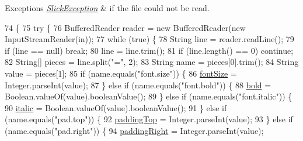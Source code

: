 \begin{DoxyExceptions}{Exceptions}
{\em \mbox{\hyperlink{classorg_1_1newdawn_1_1slick_1_1_slick_exception}{Slick\+Exception}}} & if the file could not be read. \\
\hline
\end{DoxyExceptions}

\begin{DoxyCode}
74                                                                \{
75         \textcolor{keywordflow}{try} \{
76             BufferedReader reader = \textcolor{keyword}{new} BufferedReader(\textcolor{keyword}{new} InputStreamReader(in));
77             \textcolor{keywordflow}{while} (\textcolor{keyword}{true}) \{
78                 String line = reader.readLine();
79                 \textcolor{keywordflow}{if} (line == null) \textcolor{keywordflow}{break};
80                 line = line.trim();
81                 \textcolor{keywordflow}{if} (line.length() == 0) \textcolor{keywordflow}{continue};
82                 String[] pieces = line.split(\textcolor{stringliteral}{"="}, 2);
83                 String name = pieces[0].trim();
84                 String value = pieces[1];
85                 \textcolor{keywordflow}{if} (name.equals(\textcolor{stringliteral}{"font.size"})) \{
86                     \mbox{\hyperlink{classorg_1_1newdawn_1_1slick_1_1font_1_1_hiero_settings_a3e39f423902a5895bd26921a14fe1044}{fontSize}} = Integer.parseInt(value);
87                 \} \textcolor{keywordflow}{else} \textcolor{keywordflow}{if} (name.equals(\textcolor{stringliteral}{"font.bold"})) \{
88                     \mbox{\hyperlink{classorg_1_1newdawn_1_1slick_1_1font_1_1_hiero_settings_a836242ef5a8edc24a2b5b8c85f9160eb}{bold}} = Boolean.valueOf(value).booleanValue();
89                 \} \textcolor{keywordflow}{else} \textcolor{keywordflow}{if} (name.equals(\textcolor{stringliteral}{"font.italic"})) \{
90                     \mbox{\hyperlink{classorg_1_1newdawn_1_1slick_1_1font_1_1_hiero_settings_a4e55c90c505a6a53fa3684288d379e6a}{italic}} = Boolean.valueOf(value).booleanValue();
91                 \} \textcolor{keywordflow}{else} \textcolor{keywordflow}{if} (name.equals(\textcolor{stringliteral}{"pad.top"})) \{
92                     \mbox{\hyperlink{classorg_1_1newdawn_1_1slick_1_1font_1_1_hiero_settings_ad0793e48192b48898df4f3a31d4b3954}{paddingTop}} = Integer.parseInt(value);
93                 \} \textcolor{keywordflow}{else} \textcolor{keywordflow}{if} (name.equals(\textcolor{stringliteral}{"pad.right"})) \{
94                     \mbox{\hyperlink{classorg_1_1newdawn_1_1slick_1_1font_1_1_hiero_settings_aca6e7bc5fddecfc1fe6fc94e864f05bc}{paddingRight}} = Integer.parseInt(value);

\end{DoxyCode}
